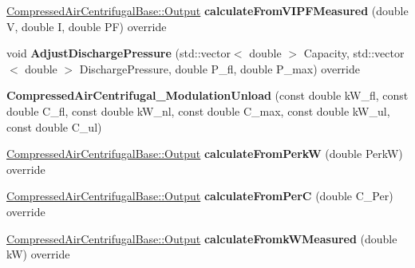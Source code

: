 \begin{DoxyCompactItemize}
\hyperlink{struct_compressed_air_centrifugal_base_1_1_output}{Compressed\+Air\+Centrifugal\+Base\+::\+Output} {\bfseries calculate\+From\+V\+I\+P\+F\+Measured} (double V, double I, double PF) override
\item 
\mbox{\label{class_compressed_air_centrifugal___modulation_unload_adbfdbf6e38b380add5012b94aa981ac7}} 
void {\bfseries Adjust\+Discharge\+Pressure} (std\+::vector$<$ double $>$ Capacity, std\+::vector$<$ double $>$ Discharge\+Pressure, double P\+\_\+fl, double P\+\_\+max) override
\item 
\mbox{\label{class_compressed_air_centrifugal___modulation_unload_a85df431a4be6f96ba472e765472cc906}} 
{\bfseries Compressed\+Air\+Centrifugal\+\_\+\+Modulation\+Unload} (const double k\+W\+\_\+fl, const double C\+\_\+fl, const double k\+W\+\_\+nl, const double C\+\_\+max, const double k\+W\+\_\+ul, const double C\+\_\+ul)
\item 
\mbox{\label{class_compressed_air_centrifugal___modulation_unload_a025968bea6cfe8b54905135cc6d3868d}} 
\hyperlink{struct_compressed_air_centrifugal_base_1_1_output}{Compressed\+Air\+Centrifugal\+Base\+::\+Output} {\bfseries calculate\+From\+PerkW} (double PerkW) override
\item 
\mbox{\label{class_compressed_air_centrifugal___modulation_unload_aa9eac2956d8db760b6a8c2cd6608f0e4}} 
\hyperlink{struct_compressed_air_centrifugal_base_1_1_output}{Compressed\+Air\+Centrifugal\+Base\+::\+Output} {\bfseries calculate\+From\+PerC} (double C\+\_\+\+Per) override
\item 
\mbox{\label{class_compressed_air_centrifugal___modulation_unload_ad3d891a99ba2eec2e710a12382fcb3d5}} 
\hyperlink{struct_compressed_air_centrifugal_base_1_1_output}{Compressed\+Air\+Centrifugal\+Base\+::\+Output} {\bfseries calculate\+Fromk\+W\+Measured} (double kW) override
\item 
\mbox{\label{class_compressed_air_centrifugal___modulation_unload_a2e49637b29a1d29d9d8a125799507858}} 

\end{DoxyCompactItemize}
